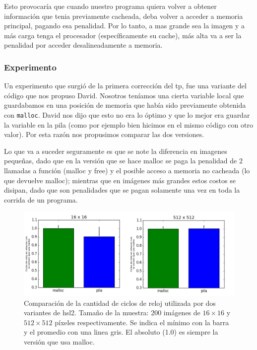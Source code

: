 Esto provocaría que cuando nuestro programa quiera volver a obtener información que tenia previamente cacheada, deba volver a acceder a memoria principal, pagando esa penalidad. Por lo tanto, a mas grande sea la imagen y a más carga tenga el procesador (específicamente su cache), más alta va a ser la penalidad por acceder desalineadamente a memoria.


\subsubsection*{Experimento}

Un experimento que surgió de la primera corrección del tp, fue una variante del código que nos propuso David. Nosotros teníamos una cierta variable local que guardabamos en una posición de memoria que había sido previamente obtenida con \texttt{malloc}. David nos dijo que esto no era lo óptimo y que lo mejor era guardar la variable en la pila (como por ejemplo bien hicimos en el mismo código con otro valor). Por esta razón nos propusimos comparar las dos versiones.

Lo que va a suceder seguramente es que se note la diferencia en imagenes pequeñas, dado que en la versión que se hace malloc se paga la penalidad de 2 llamadas a función (malloc y free) y el posible acceso a memoria no cacheada (lo que devuelve malloc); mientras que en imágenes más grandes estos costos se disipan, dado que son penalidades que se pagan solamente una vez en toda la corrida de un programa.

\begin{figure}[H] 
	\centering
  \includegraphics[scale=0.7]{images/hsl-malloc.png}
  \caption{Comparación de la cantidad de ciclos de reloj utilizada por dos variantes de hsl2. Tamaño de la muestra: 200 imágenes de $16 \times 16$ y $512 \times 512$ píxeles respectivamente. Se indica el mínimo con la barra y el promedio con una linea gris. El absoluto (1.0) es siempre la versión que usa malloc.}
\end{figure}


